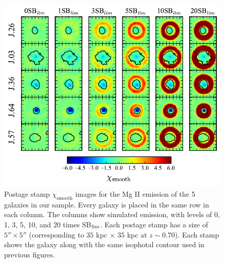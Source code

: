 \documentclass[twocolumn]{aastex61}
\begin{document}
\begin{figure}[p]
\centering
\includegraphics[scale=1.2]{../Figures/sigmas.pdf}
\caption{Postage stamp $\chi_{\text{smooth}}$ images for the Mg II emission of the 5 galaxies in our sample. Every galaxy is placed in the same row in each column. The columns show simulated emission, with levels of 0, 1, 3, 5, 10, and 20 times SB$_{\rm lim}$.  Each postage stamp has a size of $5'' \times 5''$ (corresponding to $35$ kpc $\times$ $35$ kpc at $z\sim 0.70$). Each stamp shows the galaxy along with the same isophotal contour used in previous figures.}
\label{fig:sigmas}
\end{figure}
\end{document}
